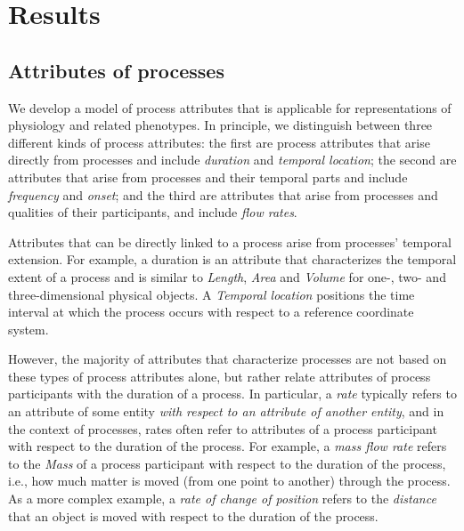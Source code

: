 \documentclass{bioinfo}
\begin{document}
\section{Results}
\subsection{Attributes of processes}
We develop a model of process attributes that is applicable for
representations of physiology and related phenotypes. In principle, we
distinguish between three different kinds of process attributes: the
first are process attributes that arise directly from processes and
include {\em duration} and {\em temporal location}; the second are
attributes that arise from processes and their temporal parts and
include {\em frequency} and {\em onset}; and the third are attributes
that arise from processes and qualities of their participants, and
include {\em flow rates}.

Attributes that can be directly linked to a process arise from
processes' temporal extension. For example, a duration is an attribute
that characterizes the temporal extent of a process and is similar to
{\em Length}, {\em Area} and {\em Volume} for one-, two- and
three-dimensional physical objects. A {\em Temporal location}
positions the time interval at which the process occurs with respect
to a reference coordinate system.

However, the majority of attributes that characterize processes are
not based on these types of process attributes alone, but rather
relate attributes of process participants with the duration of a
process. In particular, a {\em rate} typically refers to an attribute
of some entity {\em with respect to an attribute of another entity},
and in the context of processes, rates often refer to attributes of a
process participant with respect to the duration of the process. For
example, a {\em mass flow rate} refers to the {\em Mass} of a process
participant with respect to the duration of the process, i.e., how
much matter is moved (from one point to another) through the process.
As a more complex example, a {\em rate of change of position} refers
to the {\em distance} that an object is moved with respect to the
duration of the process.
\end{document}
